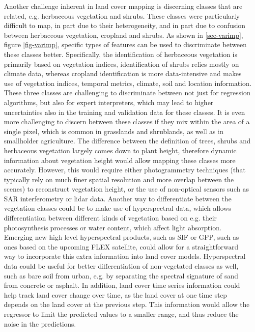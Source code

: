 \documentclass[review,authoryear,3p]{elsarticle}
\begin{document}
Another challenge inherent in land cover mapping is discerning classes that are related, e.g. herbaceous vegetation and shrubs.
These classes were particularly difficult to map, in part due to their heterogeneity, and in part due to confusion between herbaceous vegetation, cropland and shrubs.
As shown in \ref{sec-varimp}, figure \ref{fig-varimp}, specific types of features can be used to discriminate between these classes better.
Specifically, the identification of herbaceous vegetation is primarily based on vegetation indices, identification of shrubs relies mostly on climate data, whereas cropland identification is more data-intensive and makes use of vegetation indices, temporal metrics, climate, soil and location information.
These three classes are challenging to discriminate between not just for regression algorithms, but also for expert interpreters, which may lead to higher uncertainties also in the training and validation data for these classes.
It is even more challenging to discern between these classes if they mix within the area of a single pixel, which is common in grasslands and shrublands, as well as in smallholder agriculture.
The difference between the definition of trees, shrubs and herbaceous vegetation largely comes down to plant height, therefore dynamic information about vegetation height would allow mapping these classes more accurately.
However, this would require either photogrammetry techniques (that typically rely on much finer spatial resolution and more overlap between the scenes) to reconstruct vegetation height, or the use of non-optical sensors such as \gls{SAR} interferometry or lidar data.
Another way to differentiate between the vegetation classes could be to make use of hyperspectral data, which allows differentiation between different kinds of vegetation based on e.g. their photosynthesis processes or water content, which affect light absorption.
Emerging new high level hyperspectral products, such as \gls{SIF} or \gls{GPP}, such as ones based on the upcoming FLEX satellite, could allow for a straightforward way to incorporate this extra information into land cover models.
Hyperspectral data could be useful for better differentiation of non-vegetated classes as well, such as bare soil from urban, e.g. by separating the spectral signature of sand from concrete or asphalt.
In addition, land cover time series information could help track land cover change over time, as the land cover at one time step depends on the land cover at the previous step.
This information would allow the regressor to limit the predicted values to a smaller range, and thus reduce the noise in the predictions.
\end{document}
